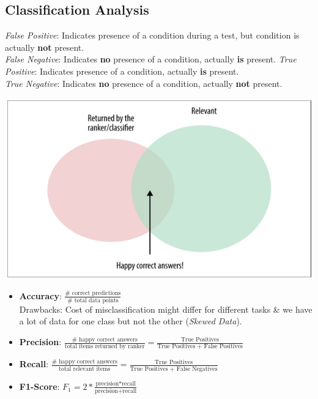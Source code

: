 \documentclass[english]{latex4ei/latex4ei_sheet}
\begin{document}
\begin{sectionbox}
\subsection{Classification Analysis}
\emph{False Positive}: Indicates presence of a condition during a test, but condition is actually \textbf{not} present.\\
\emph{False Negative}: Indicates \textbf{no} presence of a condition, actually \textbf{is} present.
\emph{True Positive}: Indicates presence of a condition, actually \textbf{is} present.\\
\emph{True Negative}: Indicates \textbf{no} presence of a condition, actually \textbf{not} present.
\begin{center}
	\includegraphics[width = 1.0\columnwidth]{figures/precession_recall.png}
\end{center}
\begin{itemize}
    \item \textbf{Accuracy}: $\frac{\text{# correct predictions}}{\text{# total data points}}$\\
    Drawbacks: Cost of misclassification might differ for different tasks \& we have a lot of data for one class but not the other (\emph{Skewed Data}).
    \item \textbf{Precision}: $\frac{\text{# happy correct answers}}{\text{total items returned by ranker}} = \frac{\text{True Positives}}{\text{True Positives + False Positives}}$
    \item \textbf{Recall}: $\frac{\text{# happy correct answers}}{\text{total relevant items}} = \frac{\text{True Positives}}{\text{True Positives + False Negatives}}$
    \item \textbf{F1-Score}: $F_1= 2*\frac{\text{precision*recall}}{\text{precision+recall}}$

\end{itemize}
\end{sectionbox}
\end{document}
